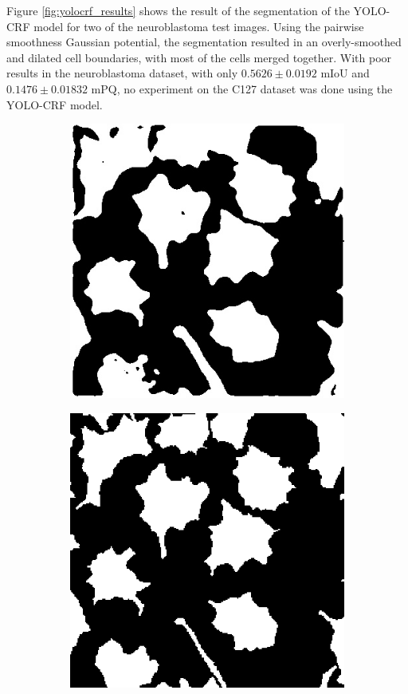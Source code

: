 \documentclass[10pt, journal, compsoc]{IEEEtran}
\begin{document}
Figure \ref{fig:yolocrf_results} shows the result of the segmentation of the YOLO-CRF model for two of the neuroblastoma test images. Using the pairwise smoothness Gaussian potential, the segmentation resulted in an overly-smoothed and dilated cell boundaries, with most of the cells merged together. With poor results in the neuroblastoma dataset, with only $0.5626\pm0.0192$ mIoU and $0.1476\pm0.01832$ mPQ, no experiment on the C127 dataset was done using the YOLO-CRF model.
\begin{figure}
\centering
\begin{subfigure}[b]{0.49\linewidth}
\includegraphics[width=\linewidth]{yolocrf/110127.jpg}
\caption{}
\end{subfigure}
\begin{subfigure}[b]{0.49\linewidth}
\includegraphics[width=\linewidth]{yolocrf/110127-label.jpg}

\end{subfigure}
\end{figure}
\end{document}

